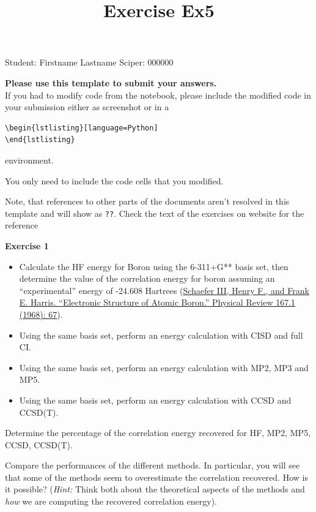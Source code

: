 \documentclass{article}
\title{Exercise Ex5}
\begin{document}
\maketitle\maketitle
\begin{center}\logo\end{center}


Student:  Firstname Lastname    Sciper: 000000

\begin{mdframed}
\textbf{Please use this template to submit your answers.}\\
If you had to modify code from the notebook, please include the modified code in your submission either as screenshot or in a

\begin{verbatim}
\begin{lstlisting}[language=Python]
\end{lstlisting}
\end{verbatim}

environment.

You only need to include the code cells that you modified.

Note, that references to other parts of the documents aren't resolved in this template and will show as \texttt{??}. Check the text of the exercises on website for the reference
\end{mdframed}

\begin{mdframed}
\textbf{Exercise 1}\\
\begin{itemize}
\item Calculate the HF energy for Boron using the 6-311+G** basis set, then determine the value of the correlation energy for boron assuming an ``experimental'' energy of -24.608 Hartrees (\href{https://journals.aps.org/pr/abstract/10.1103/PhysRev.167.67}{Schaefer III, Henry F., and Frank E. Harris. ``Electronic Structure of Atomic Boron.'' Physical Review 167.1 (1968): 67}).
\item Using the same basis set, perform an energy calculation with CISD and full CI.
\item Using the same basis set, perform an energy calculation with MP2, MP3 and MP5.
\item Using the same basis set, perform an energy calculation with CCSD and CCSD(T).
\end{itemize}

Determine the percentage of the correlation energy recovered for HF, MP2, MP5, CCSD, CCSD(T).

Compare the performances of the different methods. In particular, you will see that some of the methods seem to overestimate the correlation recovered. How is it possible? (\textit{Hint:} Think both about the theoretical aspects of the methods and \textit{how} we are computing the recovered correlation energy).
\end{mdframed}
\end{document}
